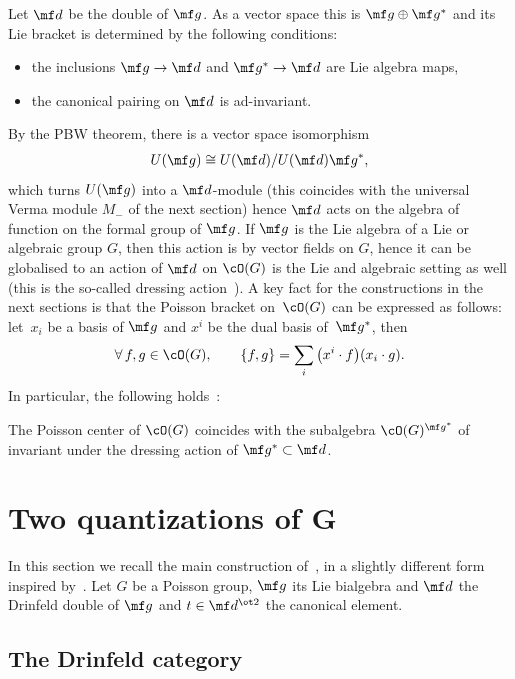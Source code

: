 Let $\mf d$ be the double of $\mf g$. As a vector space this is $\mf g \oplus \mf g^*$ and its Lie bracket is determined by the following conditions:
\begin{itemize}\itemsep=0pt
	\item the inclusions $\mf g\rightarrow \mf d$ and $\mf g^* \rightarrow \mf d$ are Lie algebra maps,
	\item the canonical pairing on $\mf d$ is ad-invariant.
\end{itemize}

By the PBW theorem, there is a vector space isomorphism
\begin{gather*}
	U(\mf g)\cong U(\mf d)/U(\mf d)\mf g^*,
\end{gather*}
which turns $U(\mf g)$ into a $\mf d$-module (this coincides with the universal Verma module $M_-$ of the next section) hence $\mf d$ acts on the algebra of function on the formal group of $\mf g$. If $\mf g$ is the Lie algebra of a Lie or algebraic group $G$, then this action is by vector f\/ields on $G$, hence it can be globalised to an action of $\mf d$ on $\cO(G)$ is the Lie and algebraic setting as well (this is the so-called dressing action~\cite{Semenov-Tian-Shansky1985}). A key fact for the constructions in the next sections is that the Poisson bracket on~$\cO(G)$ can be expressed as follows: let~$x_i$ be a basis of $\mf g$ and $x^i$ be the dual basis of~$\mf g^*$, then
\begin{gather*}
	\forall\, f,g \in \cO(G),\qquad \{f,g\}=\sum_i \big(x^i\cdot f\big)(x_i\cdot g).
\end{gather*}
In particular, the following holds~\cite{Semenov-Tian-Shansky1985}:
\begin{prop}\label{prop:dressing}
The Poisson center of $\cO(G)$ coincides with the subalgebra $\cO(G)^{\mf g^*}$ of invariant under the dressing action of $\mf g^* \subset \mf d$.
\end{prop}

\section[Two quantizations of $G$]{Two quantizations of $\boldsymbol{G}$}
In this section we recall the main construction of~\cite{Etingof1996}, in a slightly dif\/ferent form inspired by~\cite{Severa2016}. Let $G$ be a Poisson group, $\mf g$ its Lie bialgebra and $\mf d$ the Drinfeld double of $\mf g$ and $t \in \mf d^{\ot 2}$ the canonical element.

\subsection{The Drinfeld category}

